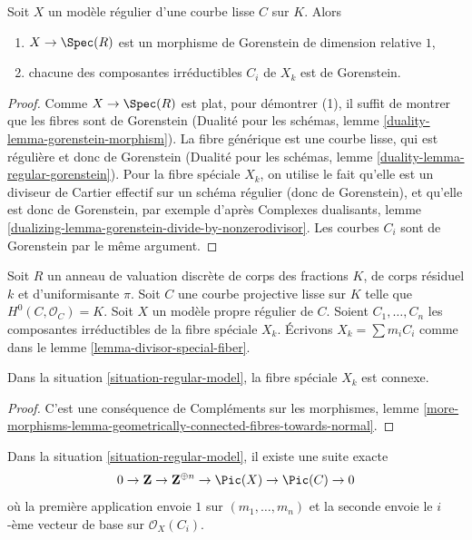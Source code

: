 \begin{lemma}
\label{lemma-gorenstein}
Soit $X$ un modèle régulier d'une courbe lisse $C$ sur $K$. Alors
\begin{enumerate}
\item $X \to \Spec(R)$ est un morphisme de Gorenstein de dimension relative $1$,
\item chacune des composantes irréductibles $C_i$ de $X_k$ est de Gorenstein.
\end{enumerate}
\end{lemma}

\begin{proof}
Comme $X \to \Spec(R)$ est plat, pour démontrer (1),
il suffit de montrer que les fibres sont de Gorenstein
(Dualité pour les schémas, lemme \ref{duality-lemma-gorenstein-morphism}).
La fibre générique est une courbe lisse, qui est régulière et donc de Gorenstein
(Dualité pour les schémas, lemme \ref{duality-lemma-regular-gorenstein}).
Pour la fibre spéciale $X_k$, on utilise le fait qu'elle est un diviseur de
Cartier effectif sur un schéma régulier (donc de Gorenstein), et qu'elle est donc
de Gorenstein, par exemple d'après Complexes dualisants, lemme
\ref{dualizing-lemma-gorenstein-divide-by-nonzerodivisor}.
Les courbes $C_i$ sont de Gorenstein par le même argument.
\end{proof}

\begin{situation}
\label{situation-regular-model}
Soit $R$ un anneau de valuation discrète de corps des fractions $K$,
de corps résiduel $k$ et d'uniformisante $\pi$.
Soit $C$ une courbe projective lisse sur $K$ telle que $H^0(C, \mathcal{O}_C) = K$.
Soit $X$ un modèle propre régulier de $C$.
Soient $C_1, \ldots, C_n$ les composantes irréductibles de la fibre
spéciale $X_k$. Écrivons $X_k = \sum m_i C_i$ comme dans le
lemme \ref{lemma-divisor-special-fiber}.
\end{situation}

\begin{lemma}
\label{lemma-regular-model-connected}
Dans la situation \ref{situation-regular-model}, la fibre spéciale $X_k$ est connexe.
\end{lemma}

\begin{proof}
C'est une conséquence de Compléments sur les morphismes, lemme
\ref{more-morphisms-lemma-geometrically-connected-fibres-towards-normal}.
\end{proof}

\begin{lemma}
\label{lemma-regular-model-pic}
Dans la situation \ref{situation-regular-model}, il existe une suite exacte
$$
0 \to \mathbf{Z} \to \mathbf{Z}^{\oplus n} \to
\Pic(X) \to \Pic(C) \to 0
$$
où la première application envoie $1$ sur $(m_1, \ldots, m_n)$ et la seconde
envoie le $i$-ème vecteur de base sur $\mathcal{O}_X(C_i)$.
\end{lemma}

